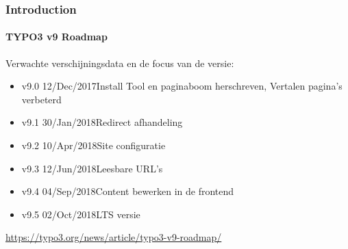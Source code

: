 \begin{frame}[fragile]
	\frametitle{Introduction}
	\framesubtitle{TYPO3 v9 Roadmap}

	Verwachte verschijningsdata en de focus van de versie:

	\begin{itemize}

		\item v9.0 \tabto{1.1cm}12/Dec/2017\tabto{3.4cm}Install Tool en paginaboom herschreven,\newline
			\tabto{3.4cm}Vertalen pagina's verbeterd
		\item
			\begingroup
				\color{typo3orange}
					v9.1 \tabto{1.1cm}30/Jan/2018\tabto{3.4cm}Redirect afhandeling
			\endgroup
		\item v9.2 \tabto{1.1cm}10/Apr/2018\tabto{3.4cm}Site configuratie
		\item v9.3 \tabto{1.1cm}12/Jun/2018\tabto{3.4cm}Leesbare URL's
		\item v9.4 \tabto{1.1cm}04/Sep/2018\tabto{3.4cm}Content bewerken in de frontend
		\item v9.5 \tabto{1.1cm}02/Oct/2018\tabto{3.4cm}LTS versie

	\end{itemize}

	\smaller
		\url{https://typo3.org/news/article/typo3-v9-roadmap/}
	\normalsize

\end{frame}

